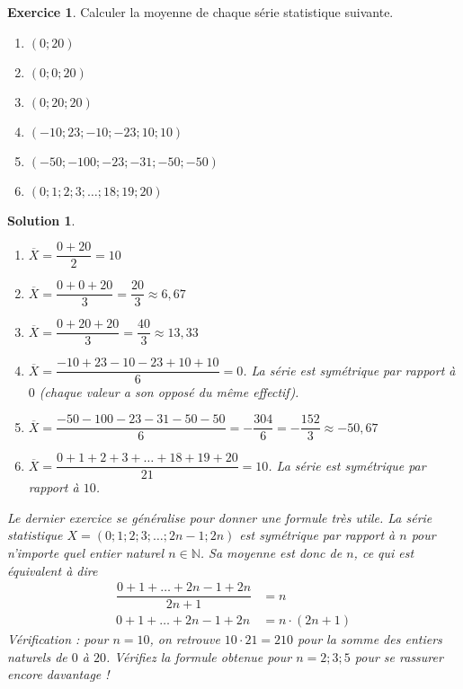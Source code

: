 \documentclass[a4paper, 14pt]{extarticle}
\theoremstyle{plain}
\newtheorem*{sol}{Solution}
\theoremstyle{definition}
\newtheorem{ex}{Exercice}
\newcommand{\N}{\mathbb{N}}
\newif\ifsolutions
\newcommand{\exe}[2]{
		\begin{ex} #1  \end{ex}
		\begin{sol} #2 \end{sol}
	}
\newcommand{\exe}[2]{
		\begin{ex} #1  \end{ex}
	}
\begin{document}
\pagestyle{fancy}
\fancyhead[C]{\textbf{Statistiques 3 \ifsolutions -- Solutions  \fi}}
\fancyhead[R]{\today}

\exe{
	Calculer la moyenne de chaque série statistique suivante.
		\begin{multicols}{2}
		\begin{enumerate}
			\item $(0; 20)$
			\item $(0; 0; 20)$
			\item $(0; 20; 20)$
			\item $(-10; 23 ; -10 ; -23 ; 10 ; 10)$
			\item $(-50 ; -100 ; -23 ; -31; -50 ; -50)$
			\item $(0; 1;2;3; \dots; 18; 19; 20)$
		\end{enumerate}
		\end{multicols}
}{

		\begin{enumerate}
			\item $\overline{X} = \dfrac{0+20}{2} = 10$
			\item $\overline{X} = \dfrac{0+0+20}{3} = \dfrac{20}3 \approx 6,67$
			\item $\overline{X} = \dfrac{0+20+20}{3} = \dfrac{40}3 \approx 13,33$
			\item $\overline{X} = \dfrac{-10+23-10-23+10+10}{6} = 0$. La série est symétrique par rapport à $0$ (chaque valeur a son opposé du même effectif).
			\item $\overline{X} = \dfrac{-50-100-23-31-50-50}{6} = -\dfrac{304}6 = -\dfrac{152}3 \approx -50,67$
			\item $\overline{X} = \dfrac{0+ 1+2+3+ \dots+ 18+ 19+ 20}{21} = 10 $. La série est symétrique par rapport à $10$.
		\end{enumerate}
		
		Le dernier exercice se généralise pour donner une formule très utile.
		La série statistique $X=(0; 1 ; 2; 3 ; \dots; 2n-1 ; 2n)$ est symétrique par rapport à $n$ pour n'importe quel entier naturel $n\in\N$.
		Sa moyenne est donc de $n$, ce qui est équivalent à dire
			\begin{align*}
				\dfrac{0 + 1 + \dots + 2n-1 + 2n}{2n+1} &= n \\
				0 + 1 + \dots + 2n-1 + 2n &= n\cdot (2n+1)
			\end{align*}
		Vérification : pour $n=10$, on retrouve $10\cdot 21 = 210$ pour la somme des entiers naturels de $0$ à $20$.
		Vérifiez la formule obtenue pour $n=2; 3; 5$ pour se rassurer encore davantage !
}
\end{document}
